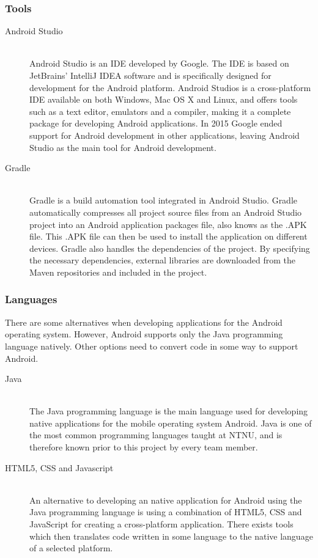 \subsubsection{Tools}
\begin{description}
    \item[Android Studio] \hfill \\
        Android Studio is an \gls{IDE} developed by Google. The \gls{IDE} is based on JetBrains' IntelliJ IDEA software and is specifically designed for development for the Android platform. Android Studios is a cross-platform IDE available on both Windows, Mac OS X and Linux, and offers tools such as a text editor, emulators and a compiler, making it a complete package for developing Android applications. In 2015 Google ended support for Android development in other applications, leaving Android Studio as the main tool for Android development.\cite{dead-eclipse}
    \item[Gradle] \hfill \\
        Gradle is a build automation tool integrated in Android Studio. Gradle automatically compresses all project source files from an Android Studio project into an Android application packages file, also knows as the .APK file. This .APK file can then be used to install the application on different devices. Gradle also handles the dependencies of the project. By specifying the necessary dependencies, external libraries are downloaded from the Maven repositories and included in the project.\cite{gradle}
\end{description}

\subsubsection{Languages}

There are some alternatives when developing applications for the Android operating system. However, Android supports only the Java programming language natively. Other options need to convert code in some way to support Android.

\begin{description}
    \item[Java] \hfill \\
        The Java programming language is the main language used for developing native applications for the mobile operating system Android. Java is one of the most common programming languages taught at \gls{NTNU}, and is therefore known prior to this project by every team member. 
    \item[HTML5, CSS and Javascript] \hfill \\
        An alternative to developing an native application for Android using the Java programming language is using a combination of HTML5, CSS and JavaScript for creating a cross-platform application. There exists tools which then translates code written in some language to the native language of a selected platform. 
    
    
    
\end{description}

